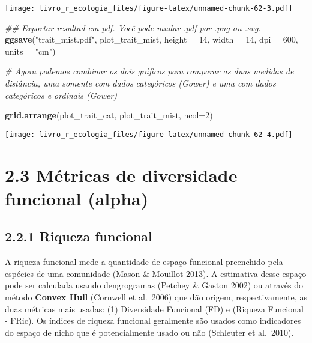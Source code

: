 \documentclass[
]{book}
\newenvironment{Shaded}{\begin{snugshade}}{\end{snugshade}}
\newcommand{\CommentTok}[1]{\textcolor[rgb]{0.56,0.35,0.01}{\textit{#1}}}
\newcommand{\DataTypeTok}[1]{\textcolor[rgb]{0.13,0.29,0.53}{#1}}
\newcommand{\DecValTok}[1]{\textcolor[rgb]{0.00,0.00,0.81}{#1}}
\newcommand{\KeywordTok}[1]{\textcolor[rgb]{0.13,0.29,0.53}{\textbf{#1}}}
\newcommand{\NormalTok}[1]{#1}
\newcommand{\OperatorTok}[1]{\textcolor[rgb]{0.81,0.36,0.00}{\textbf{#1}}}
\newcommand{\StringTok}[1]{\textcolor[rgb]{0.31,0.60,0.02}{#1}}
\begin{document}
\texttt{[image: livro\_r\_ecologia\_files/figure-latex/unnamed-chunk-62-3.pdf]}

\begin{Shaded}
\begin{Highlighting}[]
\CommentTok{## Exportar resultad em pdf. Você pode mudar .pdf por .png ou .svg.}
\KeywordTok{ggsave}\NormalTok{(}\StringTok{"trait_mist.pdf"}\NormalTok{, plot_trait_mist, }\DataTypeTok{height =} \DecValTok{14}\NormalTok{, }\DataTypeTok{width =} \DecValTok{14}\NormalTok{, }\DataTypeTok{dpi =} \DecValTok{600}\NormalTok{, }\DataTypeTok{units =} \StringTok{"cm"}\NormalTok{)}

\CommentTok{# Agora podemos combinar os dois gráficos para comparar as duas medidas de distância, uma somente com dados categóricos (Gower) e uma com dados categóricos e ordinais (Gower)}

\KeywordTok{grid.arrange}\NormalTok{(plot_trait_cat, plot_trait_mist, }\DataTypeTok{ncol=}\DecValTok{2}\NormalTok{)}
\end{Highlighting}
\end{Shaded}

\texttt{[image: livro\_r\_ecologia\_files/figure-latex/unnamed-chunk-62-4.pdf]}

\hypertarget{muxe9tricas-de-diversidade-funcional-alpha}{%
\section{2.3 Métricas de diversidade funcional (alpha)}\label{muxe9tricas-de-diversidade-funcional-alpha}}

\hypertarget{riqueza-funcional}{%
\subsection{2.2.1 Riqueza funcional}\label{riqueza-funcional}}

A riqueza funcional mede a quantidade de espaço funcional preenchido pela espécies de uma comunidade (Mason \& Mouillot 2013). A estimativa desse espaço pode ser calculada usando dengrogramas (Petchey \& Gaston 2002) ou através do método \textbf{Convex Hull} (Cornwell et al.~2006) que dão origem, respectivamente, as duas métricas mais usadas: (1) Diversidade Funcional (FD) e (Riqueza Funcional - FRic). Os índices de riqueza funcional geralmente são usados como indicadores do espaço de nicho que é potencialmente usado ou não (Schleuter et al.~2010).

\begin{Shaded}
\end{Shaded}
\end{document}
